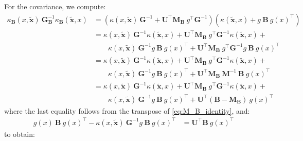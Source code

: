 For the covariance, we compute:
\begin{equation}
	\begin{aligned}
	\kappa_{\mathbf{B}}(x,\tilde{\mathbf{x}})\:\mathbf{G}_{\mathbf{B}}^{-1}\kappa_{\mathbf{B}}(\tilde{\mathbf{x}},x)&=\left(\kappa(x,\tilde{\mathbf{x}})\:\mathbf{G}^{-1}+\mathbf{U}^\top \mathbf{M}_{\mathbf{B}}\:g^\top \mathbf{G}^{-1}\right)\left(\kappa(\tilde{\mathbf{x}},x)+g\:\mathbf{B}\:g(x)^\top\right)\\
	&=\kappa(x,\tilde{\mathbf{x}})\:\mathbf{G}^{-1}\kappa(\tilde{\mathbf{x}},x)+\mathbf{U}^\top \mathbf{M}_{\mathbf{B}}\:g^\top \mathbf{G}^{-1}\kappa(\tilde{\mathbf{x}},x)+\\
	&\qquad \kappa(x,\tilde{\mathbf{x}})\:\mathbf{G}^{-1}g\:\mathbf{B}\:g(x)^\top+\mathbf{U}^\top \mathbf{M}_{\mathbf{B}}\:g^\top \mathbf{G}^{-1}g\:\mathbf{B}\:g(x)^\top\\
	&=\kappa(x,\tilde{\mathbf{x}})\:\mathbf{G}^{-1}\kappa(\tilde{\mathbf{x}},x)+\mathbf{U}^\top \mathbf{M}_{\mathbf{B}}\:g^\top \mathbf{G}^{-1}\kappa(\tilde{\mathbf{x}},x)+\\
	&\qquad \kappa(x,\tilde{\mathbf{x}})\:\mathbf{G}^{-1}g\:\mathbf{B}\:g(x)^\top+\mathbf{U}^\top \mathbf{M}_{\mathbf{B}}\:\mathbf{M}^{-1}\:\mathbf{B}\:g(x)^\top\\
	&=\kappa(x,\tilde{\mathbf{x}})\:\mathbf{G}^{-1}\kappa(\tilde{\mathbf{x}},x)+\mathbf{U}^\top \mathbf{M}_{\mathbf{B}}\:g^\top \mathbf{G}^{-1}\kappa(\tilde{\mathbf{x}},x)+\\
	&\qquad \kappa(x,\tilde{\mathbf{x}})\:\mathbf{G}^{-1}g\:\mathbf{B}\:g(x)^\top+\mathbf{U}^\top(\mathbf{B}-\mathbf{M}_{\mathbf{B}})\:g(x)^\top
	\end{aligned}
\end{equation}
where the last equality follows from the transpose of \eqref{eq:M_B_identity}, and:
\begin{equation}
	\begin{aligned}
	g(x)\:\mathbf{B}\:g(x)^\top-\kappa(x,\tilde{\mathbf{x}})\:\mathbf{G}^{-1}g\:\mathbf{B}\:g(x)^\top&=\mathbf{U}^\top \mathbf{B}\:g(x)^\top
	\end{aligned}
\end{equation}
to obtain:
